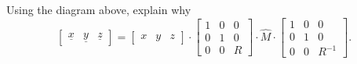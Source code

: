 \documentclass{ximera}
\begin{document}
\begin{problem}
Using the diagram above, explain why%
\[
\begin{bmatrix}
\underline{x} & \underline{y} & \underline{z}%
\end{bmatrix}
=\begin{bmatrix}
x & y & z
\end{bmatrix}
  \cdot\begin{bmatrix}
%
1 & 0 & 0\\
0 & 1 & 0\\
0 & 0 & R
\end{bmatrix}
  \cdot\hat{M}\cdot\begin{bmatrix}
%
1 & 0 & 0\\
0 & 1 & 0\\
0 & 0 & R^{-1}%
\end{bmatrix}.
\]

\end{problem}

\end{document}
